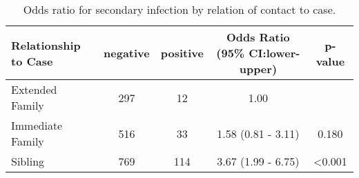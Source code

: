 
\begin{table}
\centering
    \caption{Odds ratio for secondary infection by relation of contact to case.}
    \begin{tabular}{@{}lcccc@{}}
    \toprule
    Relationship to Case & negative    & positive        & Odds Ratio (95\% CI:lower-upper)  & p-value \\
    \midrule
  Extended Family   &    297 &      12 & 1.00    &      ~ \\
  Immediate Family    &  516 &       33 &  1.58 (0.81 - 3.11) & 0.180 \\
  Sibling              & 769 &     114 & 3.67 (1.99 - 6.75) & \textless0.001 \\
    \bottomrule
    \end{tabular}
\end{table}

